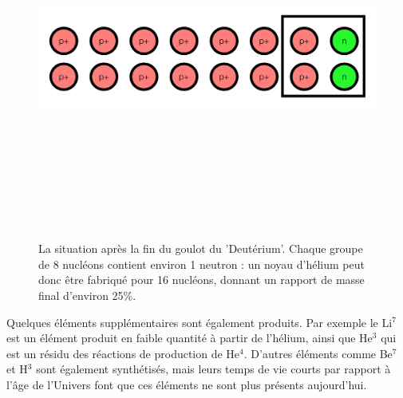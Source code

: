 \begin{figure}[htbp]
	\centering
		\includegraphics[height=12cm]{figs/helium.png}
	\caption[La situation après la fin du goulot du Deutérium]{La situation après la fin du goulot du 'Deutérium'. Chaque groupe de 8 nucléons contient environ 1 neutron : un noyau d'hélium peut donc être fabriqué pour 16 nucléons, donnant un rapport de masse final d'environ 25\%.}
	\label{f:helium}
\end{figure}

Quelques éléments supplémentaires sont également produits. Par exemple le Li$^7$ est un élément produit en faible quantité à partir de l'hélium, ainsi que He$^3$ qui est un résidu des réactions de production de He$^4$. D'autres éléments comme Be$^7$  et H$^3$ sont également synthétisés, mais leurs temps de vie courts par rapport à l'âge de l'Univers font que ces éléments ne sont plus présents aujourd'hui. 


